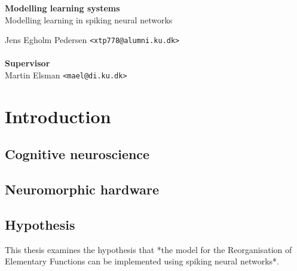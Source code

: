\documentclass[a4paper,oneside]{memoir}
\begin{document}
    \thispagestyle{empty}
    \begin{adjustwidth}{-3cm}{-1.5cm}
    \vspace*{2.5cm}
    \textbf{\Huge Modelling learning systems} \\
    \vspace*{.8cm}
    {\huge Modelling learning in spiking neural networks}\\
    \begin{tabbing}
    Jens Egholm Pedersen \hspace{1cm} \= \texttt{<xtp778@alumni.ku.dk>} \\
    \\[11cm]

    \textbf{\Large Supervisor} \\
    Martin Elsman \hspace{1cm} \texttt{<mael@di.ku.dk>}
    \end{tabbing}
    \end{adjustwidth}

    \newpage

    \ClearWallPaper

\renewcommand\cftchapteraftersnumb{\normalfont}
\renewcommand\cftbeforechapterskip{5pt plus 1pt}

\frontmatter
\setcounter{tocdepth}{2}
\tableofcontents*
\newpage

\mainmatter
\chapter{Introduction} \label{sec:intro}

  \section{Cognitive neuroscience}
  \section{Neuromorphic hardware}
  \section{Hypothesis} \label{sec:hypothesis}
  This thesis examines the hypothesis that *the model for the Reorganisation of Elementary Functions can be implemented using spiking neural networks*.
\end{document}
